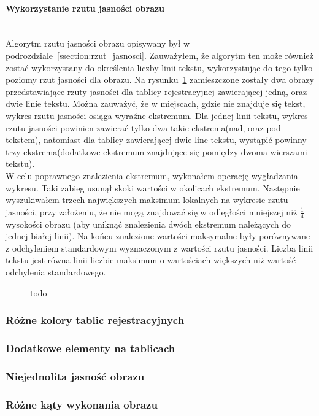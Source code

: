 \paragraph{Wykorzystanie rzutu jasności obrazu}\mbox{}\\
Algorytm rzutu jasności obrazu opisywany był w podrozdziale~\ref{ssection:rzut_jasnosci}. Zauważyłem, że algorytm ten może również zostać wykorzystany do określenia liczby linii tekstu, wykorzystując do tego tylko poziomy rzut jasności dla obrazu. Na rysunku~\ref{fig:rzut_liczba_linii} zamieszczone zostały dwa obrazy przedstawiające rzuty jasności dla tablicy rejestracyjnej zawierającej jedną, oraz dwie linie tekstu. Można zauważyć, że w miejscach, gdzie nie znajduje się tekst, wykres rzutu jasności osiąga wyraźne ekstremum. Dla jednej linii tekstu, wykres rzutu jasności powinien zawierać tylko dwa takie ekstrema(nad, oraz pod tekstem), natomiast dla tablicy zawierającej dwie line tekstu, wystąpić powinny trzy ekstrema(dodatkowe ekstremum znajdujące się pomiędzy dwoma wierszami tekstu).\\
W celu poprawnego znalezienia ekstremum, wykonałem operację wygładzania wykresu. Taki zabieg usunął skoki wartości w okolicach ekstremum. Następnie wyszukiwałem trzech największych maksimum lokalnych na wykresie rzutu jasności, przy założeniu, że nie mogą znajdować się w odległości mniejszej niż $\frac{1}{4}$ wysokości obrazu (aby uniknąć znalezienia dwóch ekstremum należących do jednej białej linii). Na końcu znalezione wartości maksymalne były porównywane z odchyleniem standardowym wyznaczonym z wartości rzutu jasności. Liczba linii tekstu jest równa linii liczbie maksimum o wartościach większych niż wartość odchylenia standardowego.

\begin{figure}
  \centering
  \caption{todo}
  \label{fig:rzut_liczba_linii}
\end{figure}


\subsubsection{Różne kolory tablic rejestracyjnych}
\subsubsection{Dodatkowe elementy na tablicach}
\subsubsection{Niejednolita jasność obrazu}
\subsubsection{Różne kąty wykonania obrazu}
